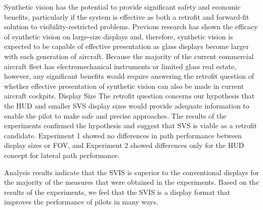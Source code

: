 \documentclass[utf8,bachelor,manualbib]{gradu3}
\begin{document}
Synthetic vision has the potential to provide significant safety and economic benefits,
particularly if the system is effective as both a retrofit and forward-fit solution
to visibility-restricted problems. Previous research has shown the efficacy of synthetic
vision on large-size displays and, therefore, synthetic vision is expected to
be capable of effective presentation as glass displays become larger with each generation
of aircraft. Because the majority of the current commercial aircraft fleet has
electromechanical instruments or limited glass real estate, however, any significant
benefits would require answering the retrofit question of whether effective
presentation of synthetic vision can also be made in current aircraft cockpits.
Display Size
The retrofit question concerns our hypothesis that the HUD and smaller SVS display
sizes would provide adequate information to enable the pilot to make safe and
precise approaches. The results of the experiments confirmed the hypothesis and
suggest that SVS is viable as a retrofit candidate. Experiment 1 showed no differences
in path performance between display sizes or FOV, and Experiment 2
showed differences only for the HUD concept for lateral path performance. \citep{prinzel2004}

Analysis results indicate that the SVIS is superior to the conventional displays
for the majority of the measures that were obtained in the experiments.
Based on the results of the experiments, we feel that the SVIS is a display format
that improves the performance of pilots in many ways. \citep{schnell2004}
\end{document}
